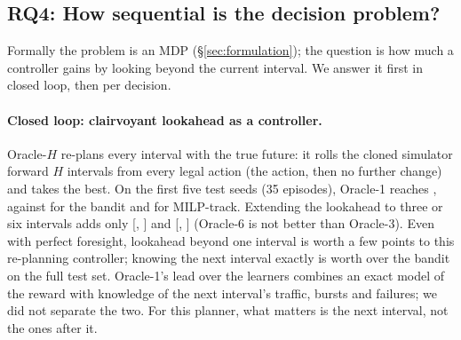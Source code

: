 \subsection{RQ4: How sequential is the decision problem?}
\label{sec:sequentiality}

Formally the problem is an MDP (\S\ref{sec:formulation}); the question is how
much a controller gains by looking beyond the current interval. We answer it
first in closed loop, then per decision.

\paragraph{Closed loop: clairvoyant lookahead as a controller.} Oracle-$H$
re-plans every interval with the true future: it rolls the cloned simulator
forward $H$ intervals from every legal action (the action, then no further
change) and takes the best. On the first five test seeds (35 episodes),
Oracle-1 reaches \LadderOraclehOne, against \LadderBandit{} for the bandit and
\LadderMilptrack{} for MILP-track. Extending the lookahead to three or six
intervals adds only \OracleThreeMinusOne{} [\OracleThreeMinusOneLo,
\OracleThreeMinusOneHi] and \OracleSixMinusOne{} [\OracleSixMinusOneLo,
\OracleSixMinusOneHi] (Oracle-6 is not better than Oracle-3). Even with
perfect foresight, lookahead beyond one interval is worth a few points to this
re-planning controller; knowing the next interval exactly is worth
\BanditBehindOracleOne{} over the bandit on the full test set. Oracle-1's lead
over the learners combines an exact model of the reward with knowledge of the
next interval's traffic, bursts and failures; we did not separate the two. For
this planner, what matters is the next interval, not the ones after it.

